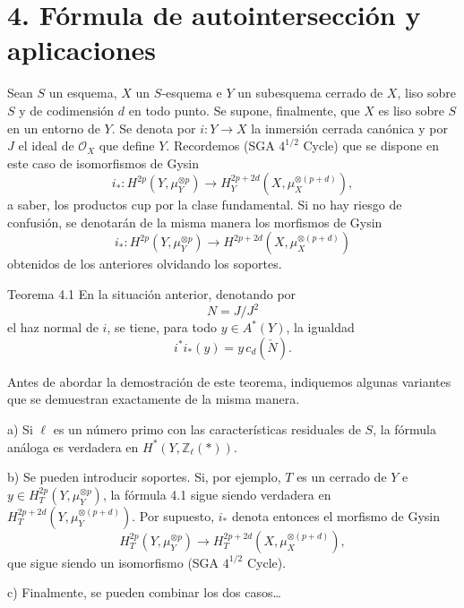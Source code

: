 \section*{4. Fórmula de autointersección y aplicaciones}

Sean $S$ un esquema, $X$ un $S$-esquema e $Y$ un subesquema cerrado de $X$, liso sobre $S$ y de codimensión $d$ en todo punto. Se supone, finalmente, que $X$ es liso sobre $S$ en un entorno de $Y$. Se denota por $i:Y\to X$ la inmersión cerrada canónica y por $J$ el ideal de $\mathcal O_X$ que define $Y$. Recordemos (SGA $4^{1/2}$ Cycle) que se dispone en este caso de isomorfismos de Gysin
\[
i_*:H^{2p}(Y,\mu_Y^{\otimes p})
\to H_Y^{2p+2d}(X,\mu_X^{\otimes(p+d)}),
\]
a saber, los productos cup por la clase fundamental. Si no hay riesgo de confusión, se denotarán de la misma manera los morfismos de Gysin
\[
i_*:H^{2p}(Y,\mu_Y^{\otimes p})
\to H^{2p+2d}(X,\mu_X^{\otimes(p+d)})
\]
obtenidos de los anteriores olvidando los soportes.

\begin{statement}{Teorema 4.1}
En la situación anterior, denotando por
\[
N=J/J^2
\]
el haz normal de $i$, se tiene, para todo $y\in A^*(Y)$, la igualdad
\[
i^*i_*(y)=y\,c_d(\check N).
\]
\end{statement}

Antes de abordar la demostración de este teorema, indiquemos algunas variantes que se demuestran exactamente de la misma manera.

a) Si $\ell$ es un número primo con las características residuales de $S$, la fórmula análoga es verdadera en $H^*(Y,\mathbb Z_\ell(*))$.

b) Se pueden introducir soportes. Si, por ejemplo, $T$ es un cerrado de $Y$ e $y\in H_T^{2p}(Y,\mu_Y^{\otimes p})$, la fórmula 4.1 sigue siendo verdadera en $H_T^{2p+2d}(Y,\mu_Y^{\otimes(p+d)})$. Por supuesto, $i_*$ denota entonces el morfismo de Gysin
\[
H_T^{2p}(Y,\mu_Y^{\otimes p})
\to H_T^{2p+2d}(X,\mu_X^{\otimes(p+d)}),
\]
que sigue siendo un isomorfismo (SGA $4^{1/2}$ Cycle).

c) Finalmente, se pueden combinar los dos casos\dots
